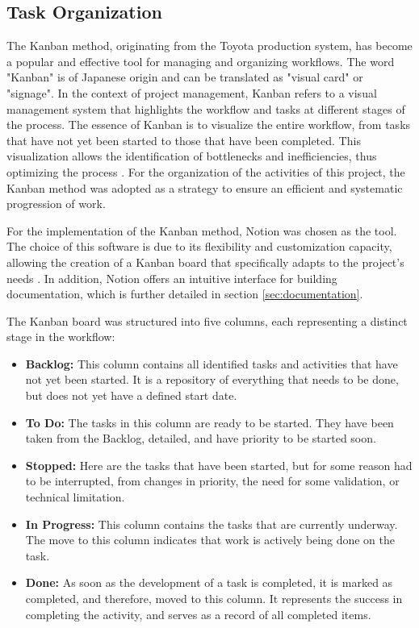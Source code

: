 \subsection{Task Organization}\label{sec:taskOrganization}
The Kanban method, originating from the Toyota production system, has become a popular and effective tool for managing and organizing workflows. The word "Kanban" is of Japanese origin and can be translated as "visual card" or "signage". In the context of project management, Kanban refers to a visual management system that highlights the workflow and tasks at different stages of the process. The essence of Kanban is to visualize the entire workflow, from tasks that have not yet been started to those that have been completed. This visualization allows the identification of bottlenecks and inefficiencies, thus optimizing the process \cite{ghani2015agile}. For the organization of the activities of this project, the Kanban method was adopted as a strategy to ensure an efficient and systematic progression of work.

For the implementation of the Kanban method, Notion was chosen as the tool. The choice of this software is due to its flexibility and customization capacity, allowing the creation of a Kanban board that specifically adapts to the project's needs \cite{notionProjectManagement}. In addition, Notion offers an intuitive interface for building documentation, which is further detailed in section \ref{sec:documentation}.

The Kanban board was structured into five columns, each representing a distinct stage in the workflow:

\begin{itemize}
    \item \textbf{Backlog:} This column contains all identified tasks and activities that have not yet been started. It is a repository of everything that needs to be done, but does not yet have a defined start date.
    \item \textbf{To Do:} The tasks in this column are ready to be started. They have been taken from the Backlog, detailed, and have priority to be started soon.
    \item \textbf{Stopped:} Here are the tasks that have been started, but for some reason had to be interrupted, from changes in priority, the need for some validation, or technical limitation.
    \item \textbf{In Progress:} This column contains the tasks that are currently underway. The move to this column indicates that work is actively being done on the task.
    \item \textbf{Done:} As soon as the development of a task is completed, it is marked as completed, and therefore, moved to this column. It represents the success in completing the activity, and serves as a record of all completed items.
\end{itemize}

